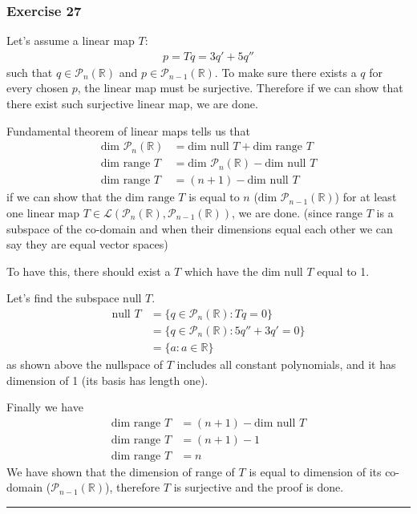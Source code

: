 \documentclass[12pt, letterpaper]{scrartcl}
\newcommand{\R}{\mathbb{R}}
\begin{document}
\subsubsection*{Exercise 27}
Let's assume a linear map $T$:
\begin{align*}
    p=Tq=3q'+5q''
\end{align*}
such that $q\in\mathcal{P}_{n}(\R)$ and $p\in\mathcal{P}_{n-1}(\R)$. To make sure there exists a $q$ for every chosen $p$, the linear map must be surjective. Therefore if we can show that there exist such surjective linear map, we are done.

Fundamental theorem of linear maps tells us that
\begin{align*}
    \text{dim }\mathcal{P}_{n}(\R)&= \text{dim null }T + \text{dim range }T\\
    \text{dim range }T &= \text{dim }\mathcal{P}_{n}(\R) - \text{dim null }T\\
    \text{dim range }T &= (n+1) - \text{dim null }T
\end{align*}
if we can show that the $\text{dim range }T$ is equal to $n$ ($\text{dim }\mathcal{P}_{n-1}(\R)$) for at least one linear map $T\in\mathcal{L}(\mathcal{P}_{n}(\R),\mathcal{P}_{n-1}(\R))$, we are done. (since range $T$ is a subspace of the co-domain and when their dimensions equal each other we can say they are equal vector spaces)

To have this, there should exist a $T$ which have the $\text{dim null }T$ equal to 1. 

Let's find the subspace $\text{null }T$.
\begin{align*}
    \text{null }T &= \{q\in\mathcal{P}_{n}(\R):Tq=0\}\\
    &=\{q\in\mathcal{P}_{n}(\R):5q''+3q'=0\}\\
    &=\{a:a\in\R\}
\end{align*}
as shown above the nullspace of $T$ includes all constant polynomials, and it has dimension of 1 (its basis has length one).

Finally we have
\begin{align*}
    \text{dim range }T &= (n+1) - \text{dim null }T\\
    \text{dim range }T &= (n+1) - 1\\
    \text{dim range }T &= n
\end{align*}
We have shown that the dimension of range of $T$ is equal to dimension of its co-domain ($\mathcal{P}_{n-1}(\R)$), therefore $T$ is surjective and the proof is done.
\vskip1mm\hrule
\end{document}
